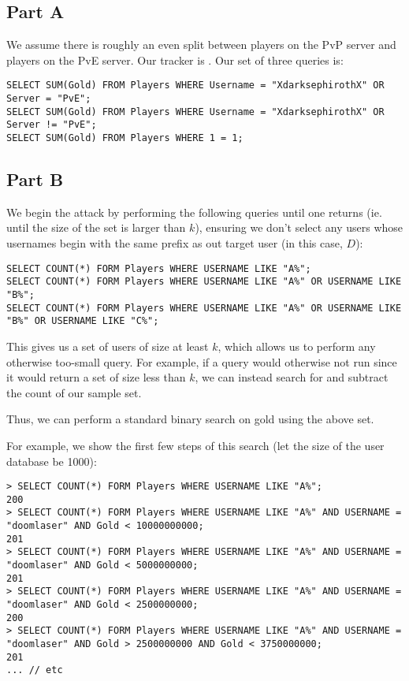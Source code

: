 \documentclass[12pt]{article}
\begin{document}
\subsection*{Part A}
We assume there is roughly an even split between players on the PvP server and players on the PvE server. Our tracker is . Our set of three queries is:
\begin{verbatim}
SELECT SUM(Gold) FROM Players WHERE Username = "XdarksephirothX" OR Server = "PvE";
SELECT SUM(Gold) FROM Players WHERE Username = "XdarksephirothX" OR Server != "PvE";
SELECT SUM(Gold) FROM Players WHERE 1 = 1;
\end{verbatim}

\subsection*{Part B}
We begin the attack by performing the following queries until one returns (ie. until the size of the set is larger than $k$), ensuring we don't select any users whose usernames begin with the same prefix as out target user (in this case, $D$):
\begin{verbatim}
SELECT COUNT(*) FORM Players WHERE USERNAME LIKE "A%";
SELECT COUNT(*) FORM Players WHERE USERNAME LIKE "A%" OR USERNAME LIKE "B%";
SELECT COUNT(*) FORM Players WHERE USERNAME LIKE "A%" OR USERNAME LIKE "B%" OR USERNAME LIKE "C%";
\end{verbatim}

This gives us a set of users of size at least $k$, which allows us to perform any otherwise too-small query. For example, if a query  would otherwise not run since it would return a set of size less than $k$, we can instead search for  and subtract the count of our sample set.

Thus, we can perform a standard binary search on gold using the above set.

For example, we show the first few steps of this search (let the size of the user database be 1000):
\begin{verbatim}
> SELECT COUNT(*) FORM Players WHERE USERNAME LIKE "A%";
200
> SELECT COUNT(*) FORM Players WHERE USERNAME LIKE "A%" AND USERNAME = "doomlaser" AND Gold < 10000000000;
201
> SELECT COUNT(*) FORM Players WHERE USERNAME LIKE "A%" AND USERNAME = "doomlaser" AND Gold < 5000000000;
201
> SELECT COUNT(*) FORM Players WHERE USERNAME LIKE "A%" AND USERNAME = "doomlaser" AND Gold < 2500000000;
200
> SELECT COUNT(*) FORM Players WHERE USERNAME LIKE "A%" AND USERNAME = "doomlaser" AND Gold > 2500000000 AND Gold < 3750000000;
201
... // etc
\end{verbatim}
\end{document}
